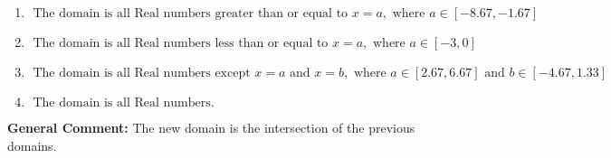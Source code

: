 \documentclass{extbook}[14pt]
\begin{document}
\begin{enumerate}
{\begin{enumerate}[label=\Alph*.]
\item \( \text{ The domain is all Real numbers greater than or equal to } x = a, \text{ where } a \in [-8.67, -1.67] \)


\item \( \text{ The domain is all Real numbers less than or equal to } x = a, \text{ where } a \in [-3, 0] \)


\item \( \text{ The domain is all Real numbers except } x = a \text{ and } x = b, \text{ where } a \in [2.67, 6.67] \text{ and } b \in [-4.67, 1.33] \)


\item \( \text{ The domain is all Real numbers. } \)


\end{enumerate}

\textbf{General Comment:} The new domain is the intersection of the previous domains.
}
\end{enumerate}
\end{document}

